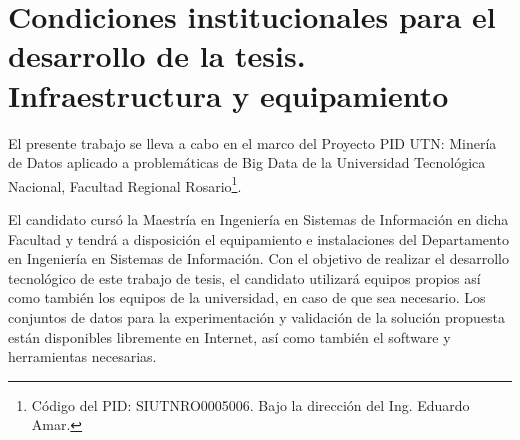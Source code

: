 \newpage \section{Condiciones institucionales para el desarrollo de la tesis. Infraestructura y equipamiento}\label{ch:condiciones}
El presente trabajo se lleva a cabo en el marco del Proyecto PID UTN: Minería de Datos aplicado a problemáticas de Big Data de la Universidad Tecnológica Nacional, Facultad Regional Rosario\footnote{Código del PID: SIUTNRO0005006. Bajo la dirección del Ing. Eduardo Amar.}.

\bigskip El candidato cursó la Maestría en Ingeniería en Sistemas de Información en dicha Facultad y tendrá a disposición el equipamiento e instalaciones del Departamento en Ingeniería en Sistemas de Información.
Con el objetivo de realizar el desarrollo tecnológico de este trabajo de tesis, el candidato utilizará equipos propios así como también los equipos de la universidad, en caso de que sea necesario.
Los conjuntos de datos para la experimentación y validación de la solución propuesta están disponibles libremente en Internet, así como también el software y herramientas necesarias.
